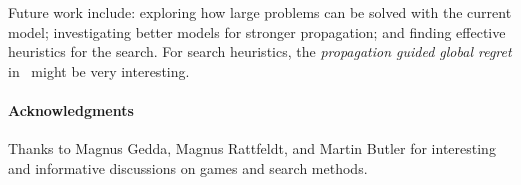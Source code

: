 \documentclass[letterpaper]{article} %
\begin{document}
Future work include: exploring how large problems can be solved with
the current model; investigating better models for stronger
propagation; and finding effective heuristics for the search. For
search heuristics, the \emph{propagation guided global regret}
in~\cite{Lagerkvist2019} might be very interesting. 

\paragraph*{ Acknowledgments}
Thanks to Magnus Gedda, Magnus Rattfeldt, and Martin Butler for
interesting and informative discussions on games and search methods.


\fontsize{9.0pt}{10.0pt}

\end{document}
